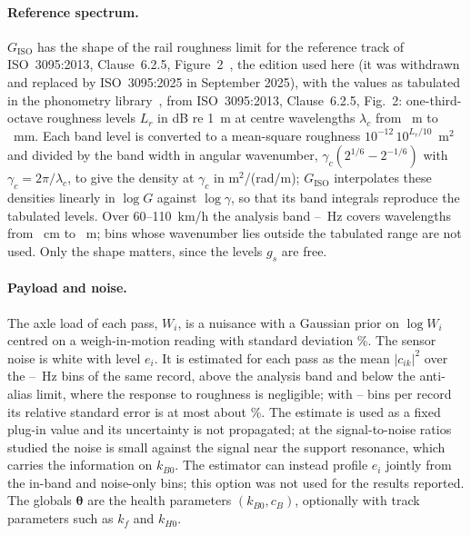 \paragraph{Reference spectrum.} $G_\mathrm{ISO}$ has the shape of the rail roughness limit for the
reference track of ISO~3095:2013, Clause~6.2.5, Figure~2~\citep{iso3095}, the edition used here (it was
withdrawn and replaced by ISO~3095:2025 in September 2025), with the values as tabulated in the phonometry
library~\citep{phonometry}, from ISO~3095:2013, Clause~6.2.5, Fig.~2: one-third-octave roughness
levels $L_r$ in dB re 1~\textmu m at \ISONBands{} centre wavelengths $\lambda_c$ from \ISOLambdaMax~m to
\ISOLambdaMinMM~mm. Each band level is converted to a mean-square roughness
$10^{-12}\,10^{L_r/10}$~m$^2$ and divided by the band width in angular wavenumber,
$\gamma_c(2^{1/6}-2^{-1/6})$ with $\gamma_c = 2\pi/\lambda_c$, to give the density at $\gamma_c$ in
m$^2$/(rad/m); $G_\mathrm{ISO}$ interpolates these densities linearly in $\log G$ against $\log\gamma$,
so that its band integrals reproduce the tabulated levels. Over 60--110~km/h the analysis band
\BandLo--\BandHi~Hz covers wavelengths from \LambdaMinCM~cm to \LambdaMaxM~m; bins whose wavenumber
lies outside the tabulated range are not used. Only the shape matters, since the levels $g_s$ are free.

\paragraph{Payload and noise.} The axle load of each pass, $W_i$, is a nuisance with a Gaussian prior on
$\log W_i$ centred on a weigh-in-motion reading with standard deviation \WIMsigmaPct\%. The sensor
noise is white with level $e_i$. It is estimated for each pass as the mean $|c_{ik}|^2$ over the
\NoiseLo--\NoiseHi~Hz bins of the same record, above the analysis band and below the anti-alias limit,
where the response to roughness is negligible; with \NoiseBinsMin--\NoiseBinsMax{} bins per record its
relative standard error is at most about \NoiseRelSEMax\%. The estimate is used as a fixed plug-in value
and its uncertainty is not propagated; at the signal-to-noise ratios studied the noise is small against
the signal near the support resonance, which carries the information on $k_{B0}$. The estimator can
instead profile $e_i$ jointly from the in-band and noise-only bins; this option was not used for the
results reported. The globals $\bm\theta$ are the health parameters $(k_{B0}, c_B)$, optionally with
track parameters such as $k_f$ and $k_{H0}$.

